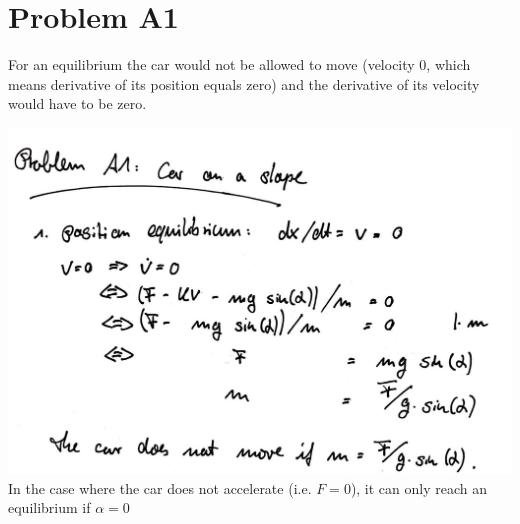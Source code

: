 \documentclass[12pt]{article}
\begin{document}
\lstset{language=C++}

\section*{Problem A1}

For an equilibrium the car would not be allowed to move (velocity 0, which means derivative of its position equals zero) and the derivative of its velocity would have to be zero.

\includegraphics[scale = 0.29]{pictures/pa1}\\

In the case where the car does not accelerate (i.e. $F=0$), it can only reach an equilibrium if $\alpha = 0$
\end{document}
